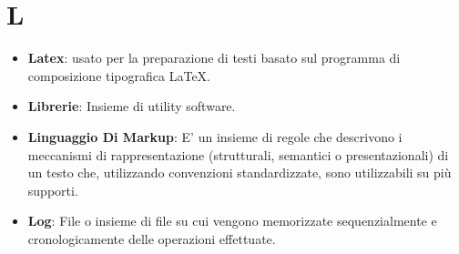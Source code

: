 \section*{L}
\begin{itemize}
	\item
	\textbf{Latex}:  usato per la preparazione di testi basato sul programma di composizione tipografica \LaTeX.
	\item
	\textbf{Librerie}: Insieme di utility software.
	\item
	\textbf{Linguaggio Di Markup}: E' un insieme di regole che descrivono i meccanismi di rappresentazione (strutturali, semantici o presentazionali) di un testo che, utilizzando convenzioni standardizzate, sono utilizzabili su più supporti.
	\item
	\textbf{Log}: File o insieme di file su cui vengono memorizzate sequenzialmente e cronologicamente delle operazioni effettuate.
\end{itemize}
\newpage